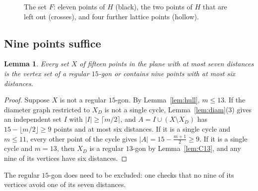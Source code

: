 \documentclass[11pt]{amsart}
\newtheorem{lemma}[theorem]{Lemma}
\theoremstyle{definition}
\theoremstyle{remark}
\begin{document}
\begin{figure}[ht]
\centering
{}
\caption{The set $F$: eleven points of $H$ (black), the two points of $H$ that are left out (crosses), and
four further lattice points (hollow).}
\label{fig:F}
\end{figure}

\subsection{Nine points suffice}
\begin{lemma}\label{lem:nine}
Every set $X$ of fifteen points in the plane with at most seven distances is the vertex set of a regular
$15$-gon or contains nine points with at most six distances.
\end{lemma}

\begin{proof}
Suppose $X$ is not a regular $15$-gon. By Lemma~\ref{lem:hull}, $m\le13$. If the diameter graph restricted
to $X_D$ is not a single cycle, Lemma~\ref{lem:diam}(3) gives an independent set $I$ with
$|I|\ge\lceil m/2\rceil$, and $A=I\cup(X\setminus X_D)$ has $15-\lfloor m/2\rfloor\ge9$ points and at most six
distances. If it is a single cycle and $m\le11$, every other point of the cycle gives
$|A|=15-\frac{m+1}2\ge9$. If it is a single cycle and $m=13$, then $X_D$ is a regular $13$-gon by
Lemma~\ref{lem:C13}, and any nine of its vertices have six distances.
\end{proof}

The regular $15$-gon does need to be excluded: one checks that no nine of its vertices avoid one of its
seven distances.
\end{document}
